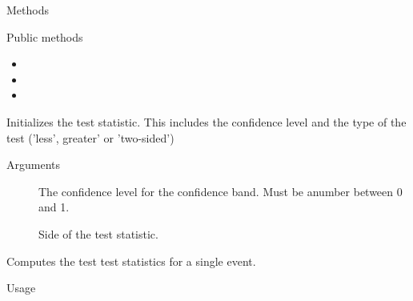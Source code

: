 \documentclass[a4paper]{book}
\begin{document}
%
\begin{Section}{Methods}
%
\begin{SubSection}{Public methods}
\begin{itemize}

\item{} 
\item{} 
\item{} 

\end{itemize}

\end{SubSection}



\hypertarget{method-TestStatisticBase-initialize}{}
%
\begin{SubSection}{}
Initializes the test statistic. This includes the
confidence level and the type of the test ('less',
greater' or 'two-sided')
%

%
\begin{SubSubSection}{Arguments}

\begin{description}

\item[] The confidence level for
the confidence band. Must be anumber between 0
and 1.
\item[] Side of the test statistic.

\end{description}



\end{SubSubSection}

\end{SubSection}




\hypertarget{method-TestStatisticBase-compute}{}
%
\begin{SubSection}{}
Computes the test test statistics for a single event.
%
\begin{SubSubSection}{Usage}


\end{SubSubSection}
\end{SubSection}
\end{Section}
\end{document}
